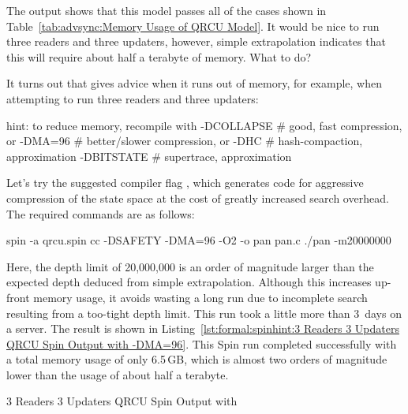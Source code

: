 The output shows that this model passes all of the cases shown in
Table~\ref{tab:advsync:Memory Usage of QRCU Model}.
It would be nice to run three readers and three
updaters, however, simple extrapolation indicates that this will
require about half a terabyte of memory.
What to do?

It turns out that  gives advice when it runs out of memory,
for example, when attempting to run three readers and three updaters:

\begin{VerbatimU}
hint: to reduce memory, recompile with
  -DCOLLAPSE # good, fast compression, or
  -DMA=96   # better/slower compression, or
  -DHC # hash-compaction, approximation
  -DBITSTATE # supertrace, approximation
\end{VerbatimU}

Let's try the suggested compiler flag ,
which generates code for aggressive compression of the
state space at the cost of greatly increased search overhead.
The required commands are as follows:

\begin{VerbatimU}
spin -a qrcu.spin
cc -DSAFETY -DMA=96 -O2 -o pan pan.c
./pan -m20000000
\end{VerbatimU}

Here, the depth limit of 20,000,000 is an order of magnitude
larger than the expected depth deduced from simple extrapolation.
Although this increases up-front memory usage, it avoids wasting
a long run due to incomplete search resulting from a too-tight
depth limit.
This run took a little more than 3~days on a  server.
The result is shown in
Listing~\ref{lst:formal:spinhint:3 Readers 3 Updaters QRCU Spin Output with -DMA=96}.
This Spin run completed successfully with a total memory
usage of only 6.5\,GB, which is almost two orders of magnitude
lower than the  usage of about half a terabyte.

\begin{listing}
\vspace*{-9pt}
\caption{3 Readers 3 Updaters QRCU Spin Output with }
\label{lst:formal:spinhint:3 Readers 3 Updaters QRCU Spin Output with -DMA=96}
\end{listing}

